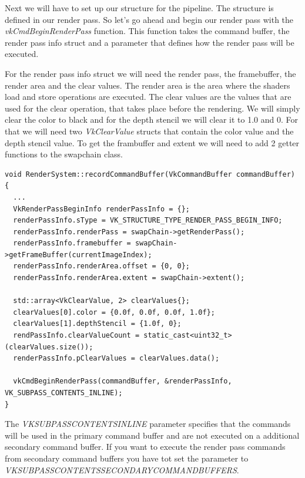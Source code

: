 \documentclass[12pt]{report} \usepackage{preamble}
\begin{document}
Next we will have to set up our structure for the pipeline. The structure is defined in our render pass. So let's go ahead and
begin our render pass with the \textit{vkCmdBeginRenderPass} function. This function takes the command buffer, the render pass
info struct and a parameter that defines how the render pass will be executed.

For the render pass info struct we will need the render pass, the framebuffer, the render area and the clear values. The render area
is the area where the shaders load and store operations are executed. The clear values are the values that are used for the clear
operation, that takes place before the rendering. We will simply clear the color to black and for the depth stencil we will clear it
to 1.0 and 0. For that we will need two \textit{VkClearValue} structs that contain the color value and the depth stencil value.
To get the frambuffer and extent we will need to add 2 getter functions to the swapchain class.

\begin{lstlisting}[Language=C++]
void RenderSystem::recordCommandBuffer(VkCommandBuffer commandBuffer) {
  ...
  VkRenderPassBeginInfo renderPassInfo = {};
  renderPassInfo.sType = VK_STRUCTURE_TYPE_RENDER_PASS_BEGIN_INFO;
  renderPassInfo.renderPass = swapChain->getRenderPass();
  renderPassInfo.framebuffer = swapChain->getFrameBuffer(currentImageIndex);
  renderPassInfo.renderArea.offset = {0, 0};
  renderPassInfo.renderArea.extent = swapChain->extent();

  std::array<VkClearValue, 2> clearValues{};
  clearValues[0].color = {0.0f, 0.0f, 0.0f, 1.0f};
  clearValues[1].depthStencil = {1.0f, 0};
  rendPassInfo.clearValueCount = static_cast<uint32_t>(clearValues.size());
  renderPassInfo.pClearValues = clearValues.data();

  vkCmdBeginRenderPass(commandBuffer, &renderPassInfo, VK_SUBPASS_CONTENTS_INLINE);
}
\end{lstlisting}

The \textit{VK\textunderscore SUBPASS\textunderscore CONTENTS\textunderscore INLINE} parameter specifies that the commands will be
used in the primary command buffer and are not executed on a additional secondary command buffer. If you want to execute the render pass
commands from secondary command buffers you have tot set the parameter to \\
\textit{VK\textunderscore SUBPASS\textunderscore CONTENTS\textunderscore SECONDARY\textunderscore COMMAND\textunderscore BUFFERS}.
\end{document}
